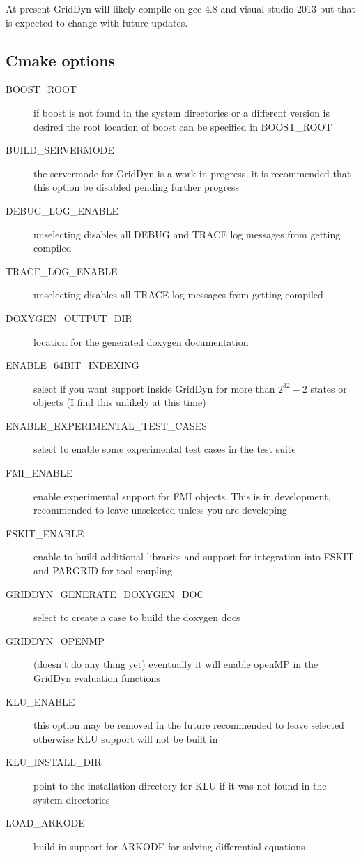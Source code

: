 \documentclass[12pt]{article} %
\begin{document}
At present GridDyn will likely compile on gcc 4.8 and visual studio 2013 but that is expected to change with future updates.
\subsection {Cmake options}
\begin{description}
\item [BOOST\_ROOT]  if boost is not found in the system directories or a different version is desired the root location of boost can be specified in BOOST\_ROOT
\item [BUILD\_SERVERMODE]  the servermode for GridDyn is a work in progress, it is recommended that this option be disabled pending further progress
\item [DEBUG\_LOG\_ENABLE] unselecting disables all DEBUG and TRACE log messages from getting compiled
\item [TRACE\_LOG\_ENABLE] unselecting disables all TRACE log messages from getting compiled
\item [DOXYGEN\_OUTPUT\_DIR] location for the generated doxygen documentation
\item [ENABLE\_64BIT\_INDEXING]  select if you want support inside GridDyn for more than $2^{32}-2$ states or objects (I find this unlikely at this time)
\item [ENABLE\_EXPERIMENTAL\_TEST\_CASES]  select to enable some experimental test cases in the test suite
\item [FMI\_ENABLE] enable experimental support for FMI objects.  This is in development,  recommended to leave unselected unless you are developing
\item [FSKIT\_ENABLE] enable to build additional libraries and support for integration into FSKIT and PARGRID for tool coupling
\item [GRIDDYN\_GENERATE\_DOXYGEN\_DOC]  select to create a case to build the doxygen docs{\tiny }
\item [GRIDDYN\_OPENMP] (doesn't do any thing yet) eventually it will enable openMP in the GridDyn evaluation functions
\item [KLU\_ENABLE] this option may be removed in the future recommended to leave selected otherwise KLU support will not be built in
\item [KLU\_INSTALL\_DIR]  point to the installation directory for KLU if it was not found in the system directories
\item [LOAD\_ARKODE] build in support for ARKODE for solving differential equations

\end{description}
\end{document}
